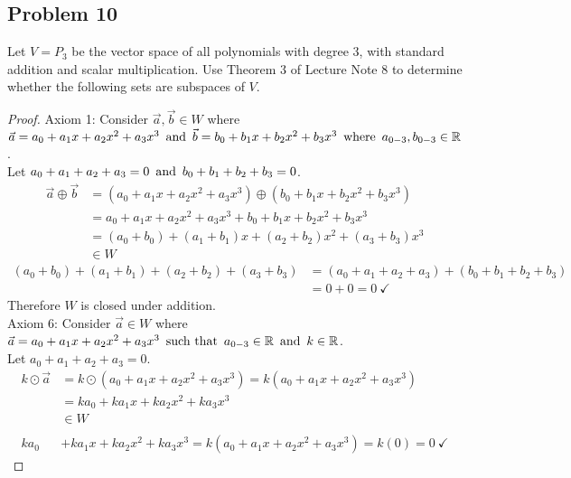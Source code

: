 \subsection*{Problem 10}
Let $V = P_3$ be the vector space of all polynomials with degree  3, with standard addition and scalar multiplication. Use Theorem 3 of Lecture Note 8 to determine whether the following sets are subspaces of $V$.
\begin{enumerate}
  \begin{proof}
    Axiom 1: Consider $\vec{a},\vec{b} \in W$ where $\vec{a} = a_0+a_1x+a_2x^2+a_3x^3 \operatorname{~\text{and}~} \vec{b} = b_0+b_1x+b_2x^2+b_3x^3 \operatorname{~\text{where}~} a_{0-3}, b_{0-3} \in \mathbb{R}$. \\
    Let $a_0+a_1+a_2+a_3=0 \operatorname{~\text{and}~} b_0+b_1+b_2+b_3=0$.
    \begin{align*}
      \vec{a} \oplus \vec{b} & = (a_0+a_1x+a_2x^2+a_3x^3) \oplus (b_0+b_1x+b_2x^2+b_3x^3) \\
                             & = a_0+a_1x+a_2x^2+a_3x^3 + b_0+b_1x+b_2x^2+b_3x^3          \\
                             & = (a_0+b_0) + (a_1+b_1)x + (a_2+b_2)x^2 + (a_3+b_3)x^3     \\
                             & \in W
    \end{align*}
    \begin{align*}
      (a_0+b_0) + (a_1+b_1) + (a_2+b_2) + (a_3+b_3) & = (a_0 + a_1 + a_2 + a_3) + (b_0 + b_1 + b_2 + b_3) \\
                                                    & = 0 + 0 = 0~\checkmark
    \end{align*}
    Therefore $W$ is closed under addition. \\
    Axiom 6: Consider $\vec{a} \in W$ where $\vec{a} = a_0+a_1x+a_2x^2+a_3x^3 \operatorname{~\text{such that}~} a_{0-3} \in \mathbb{R} \operatorname{~\text{and}~} k \in \mathbb{R}$. \\
    Let $a_0+a_1+a_2+a_3=0$.
    \begin{align*}
      k \odot \vec{a} & = k \odot (a_0+a_1x+a_2x^2+a_3x^3) = k(a_0+a_1x+a_2x^2+a_3x^3)           \\
                      & = ka_0+ka_1x+ka_2x^2+ka_3x^3                                             \\
                      & \in W                                                                    \\ \\
      ka_0            & +ka_1x+ka_2x^2+ka_3x^3 = k(a_0+a_1x+a_2x^2+a_3x^3) = k(0) = 0~\checkmark

\end{align*}
\end{proof}
\end{enumerate}
